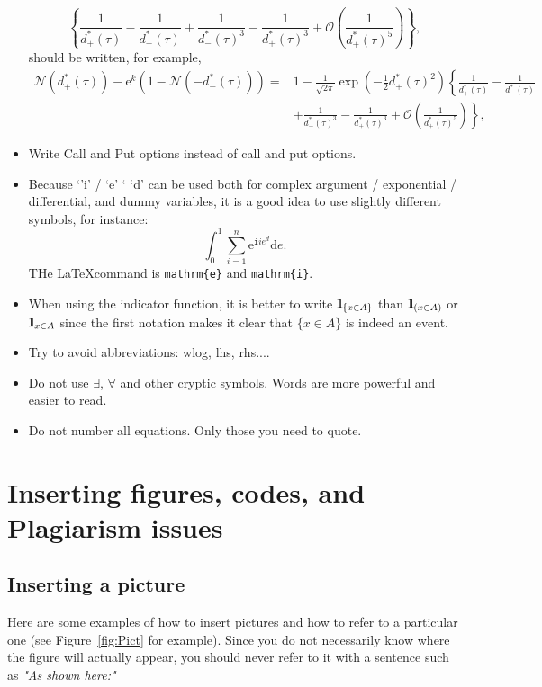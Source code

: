 \documentclass[a4paper, twoside]{report}
\theoremstyle{definition}
\newcommand{\ind}{1\hspace{-2.1mm}{1}} %
\newcommand{\I}{\mathtt{i}}
\newcommand{\D}{\mathrm{d}}
\newcommand{\E}{\mathrm{e}}
\numberwithin{equation}{section}
\begin{document}
\begin{itemize}
$$          \left\{\frac{1}{d_{+}^*(\tau)} -\frac{1}{d_{-}^*(\tau)}
          + \frac{1}{d_{-}^*(\tau)^3} - \frac{1}{d_{+}^*(\tau)^3}
          + \mathcal{O}\left(\frac{1}{d_{+}^*(\tau)^5}\right)\right\},
        $$
        should be written, for example,
        \begin{align*}
          \mathcal{N}\left(d_+^*(\tau)\right)-\E^k\left(1-\mathcal{N}\left(-d_-^*(\tau)\right)\right)
          = & 1- \frac{1}{\sqrt{2\pi}}\exp\left(-\frac{1}{2}d_{+}^*(\tau)^2\right)
          \left\{\frac{1}{d_{+}^*(\tau)} -\frac{1}{d_{-}^*(\tau)}\right.           \\
            & \left.
          + \frac{1}{d_{-}^*(\tau)^3} - \frac{1}{d_{+}^*(\tau)^3}
          + \mathcal{O}\left(\frac{1}{d_{+}^*(\tau)^5}\right)\right\},
        \end{align*}
  \item Write Call and Put options instead of call and put options.
  \item Because `'i' / `e' ` `d' can be used both for complex argument / exponential / differential,
        and dummy variables, it is a good idea to use slightly different symbols, for instance:
        $$
          \int_{0}^{1}\sum_{i=1}^{n}\E^{\I i e^d} \D e.
        $$
        THe \LaTeX command is \texttt{mathrm\{e\}} and \texttt{mathrm\{i\}}.
  \item When using the indicator function, it is better to write
        $\ind_{\{x\in A\}}$ than $\ind_{(x\in A)}$ or $\ind_{x\in A}$
        since the first notation makes it clear that $\{x\in A\}$ is indeed an event.
  \item Try to avoid abbreviations: wlog, lhs, rhs....
  \item Do not use $\exists$, $\forall$ and other cryptic symbols.
        Words are more powerful and easier to read.
  \item Do not number all equations. Only those you need to quote.
\end{itemize}

\chapter{Inserting figures, codes, and Plagiarism issues}
\section{Inserting a picture}
Here are some examples of how to insert pictures and how to refer to a particular one (see Figure~\ref{fig:Pict} for example).
Since you do not necessarily know where the figure will actually appear,
you should never refer to it with a sentence such as {\it "As shown here:"}
\end{document}
